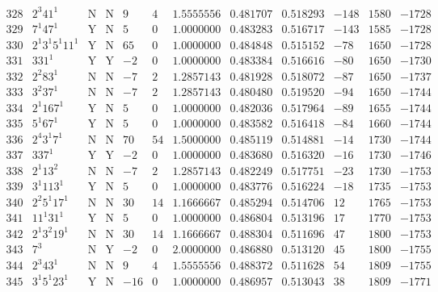 \documentclass[11pt,reqno,a4letter]{article}
\numberwithin{figure}{section}
\numberwithin{table}{section}
\theoremstyle{plain}
\numberwithin{theorem}{section}
\theoremstyle{definition}
\begin{document}
\begin{table}[h!]
\begin{equation*}
{\begin{array}{cc|cc|ccc|cc|ccc}
 328 & 2^3 41^1 & \text{N} & \text{N} & 9 & 4 & 1.5555556 & 0.481707 & 0.518293 & -148 & 1580 & -1728 \\
 329 & 7^1 47^1 & \text{Y} & \text{N} & 5 & 0 & 1.0000000 & 0.483283 & 0.516717 & -143 & 1585 & -1728 \\
 330 & 2^1 3^1 5^1 11^1 & \text{Y} & \text{N} & 65 & 0 & 1.0000000 & 0.484848 & 0.515152 & -78 & 1650 & -1728 \\
 331 & 331^1 & \text{Y} & \text{Y} & -2 & 0 & 1.0000000 & 0.483384 & 0.516616 & -80 & 1650 & -1730 \\
 332 & 2^2 83^1 & \text{N} & \text{N} & -7 & 2 & 1.2857143 & 0.481928 & 0.518072 & -87 & 1650 & -1737 \\
 333 & 3^2 37^1 & \text{N} & \text{N} & -7 & 2 & 1.2857143 & 0.480480 & 0.519520 & -94 & 1650 & -1744 \\
 334 & 2^1 167^1 & \text{Y} & \text{N} & 5 & 0 & 1.0000000 & 0.482036 & 0.517964 & -89 & 1655 & -1744 \\
 335 & 5^1 67^1 & \text{Y} & \text{N} & 5 & 0 & 1.0000000 & 0.483582 & 0.516418 & -84 & 1660 & -1744 \\
 336 & 2^4 3^1 7^1 & \text{N} & \text{N} & 70 & 54 & 1.5000000 & 0.485119 & 0.514881 & -14 & 1730 & -1744 \\
 337 & 337^1 & \text{Y} & \text{Y} & -2 & 0 & 1.0000000 & 0.483680 & 0.516320 & -16 & 1730 & -1746 \\
 338 & 2^1 13^2 & \text{N} & \text{N} & -7 & 2 & 1.2857143 & 0.482249 & 0.517751 & -23 & 1730 & -1753 \\
 339 & 3^1 113^1 & \text{Y} & \text{N} & 5 & 0 & 1.0000000 & 0.483776 & 0.516224 & -18 & 1735 & -1753 \\
 340 & 2^2 5^1 17^1 & \text{N} & \text{N} & 30 & 14 & 1.1666667 & 0.485294 & 0.514706 & 12 & 1765 & -1753 \\
 341 & 11^1 31^1 & \text{Y} & \text{N} & 5 & 0 & 1.0000000 & 0.486804 & 0.513196 & 17 & 1770 & -1753 \\
 342 & 2^1 3^2 19^1 & \text{N} & \text{N} & 30 & 14 & 1.1666667 & 0.488304 & 0.511696 & 47 & 1800 & -1753 \\
 343 & 7^3 & \text{N} & \text{Y} & -2 & 0 & 2.0000000 & 0.486880 & 0.513120 & 45 & 1800 & -1755 \\
 344 & 2^3 43^1 & \text{N} & \text{N} & 9 & 4 & 1.5555556 & 0.488372 & 0.511628 & 54 & 1809 & -1755 \\
 345 & 3^1 5^1 23^1 & \text{Y} & \text{N} & -16 & 0 & 1.0000000 & 0.486957 & 0.513043 & 38 & 1809 & -1771 \\

\end{array}}
\end{equation*}
\end{table}
\end{document}
